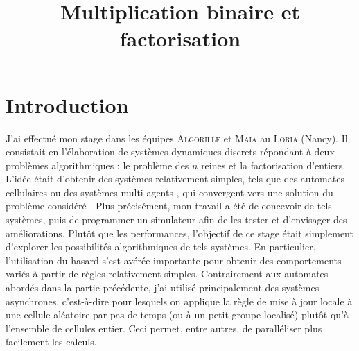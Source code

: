 \documentclass[11pt, openany, a4paper]{article}
\newcommand{\ANNOT}[1]{
  ~\linebreak
  \centerline{
    \large\fcolorbox{black}{bleuclair}{
      \begin{minipage}[h]{.8\linewidth}
      #1
      \end{minipage}
    }
  }
}
\begin{document}
\renewcommand{\labelitemi}{$\bullet$}

\title{\vspace{-3em}Multiplication binaire et factorisation}
\date{}


\maketitle

% 
\vspace{-5em}
\part*{Introduction}

J'ai effectué mon stage dans les équipes \textsc{Algorille} et \textsc{Maia} au \textsc{Loria} (Nancy). Il consistait en l'élaboration de systèmes dynamiques discrets répondant à deux problèmes algorithmiques : le problème des $n$ reines et la factorisation d'entiers. L'idée était d'obtenir des systèmes relativement simples, tels que des automates cellulaires ou des systèmes multi-agents \cite{ChevFat08}, qui convergent vers une solution du problème considéré \cite{BahiC06}. Plus précisément, mon travail a été de concevoir de tels systèmes, puis de programmer un simulateur afin de les tester et d'envisager des améliorations. Plutôt que les performances, l'objectif de ce stage était simplement d'explorer les possibilités algorithmiques de tels systèmes. En particulier, l'utilisation du hasard s'est avérée importante pour obtenir des comportements variés à partir de règles relativement simples. Contrairement aux automates abordés dans la partie précédente, j'ai utilisé principalement des systèmes asynchrones, c'est-à-dire pour lesquels on applique la règle de mise à jour locale à une cellule aléatoire par pas de temps (ou à un petit groupe localisé) plutôt qu'à l'ensemble de cellules entier. Ceci permet, entre autres, de paralléliser plus facilement les calculs.
\end{document}
